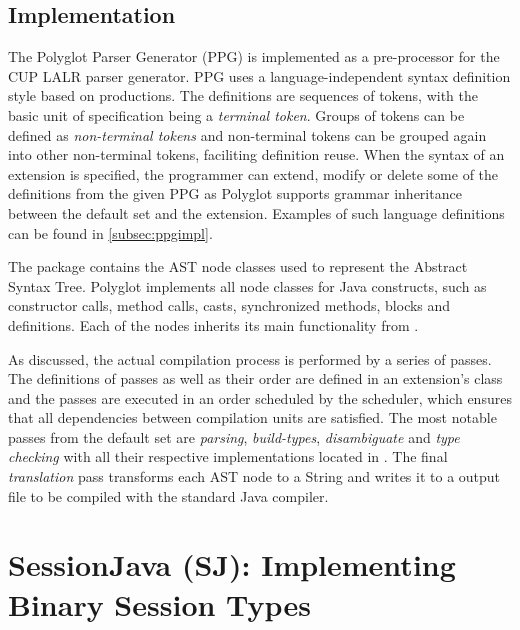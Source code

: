 \subsection{Implementation}
\label{subsec:polyglotimpl}

The Polyglot Parser Generator (PPG) is implemented as a pre-processor for the CUP LALR parser generator\cite{cuplalr}. PPG uses a language-independent syntax definition style based on productions. The definitions are sequences of tokens, with the basic unit of specification being a \textit{terminal token}. Groups of tokens can be defined as \textit{non-terminal tokens} and non-terminal tokens can be grouped again into other non-terminal tokens, faciliting definition reuse. When the syntax of an extension is specified, the programmer can extend, modify or delete some of the definitions from the given PPG as Polyglot supports grammar inheritance between the default set and the extension. Examples of such language definitions can be found in \autoref{subsec:ppgimpl}.

The package  contains the AST node classes used to represent the Abstract Syntax Tree. Polyglot implements all node classes for Java constructs, such as constructor calls, method calls, casts, synchronized methods, blocks and definitions. Each of the nodes inherits its main functionality from .

As discussed, the actual compilation process is performed by a series of passes. The definitions of passes as well as their order are defined in an extension's  class and the passes are executed in an order scheduled by the scheduler, which ensures that all dependencies between compilation units are satisfied. The most notable passes from the default set are \textit{parsing}, \textit{build-types}, \textit{disambiguate} and \textit{type checking} with all their respective implementations located in . The final \textit{translation} pass transforms each AST node to a String and writes it to a  output file to be compiled with the standard Java compiler.

		
		
\section{SessionJava (SJ): Implementing Binary Session Types}
\label{sec:sessionj}

